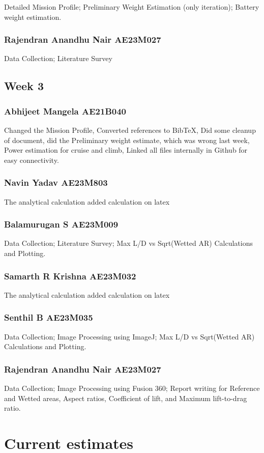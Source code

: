 \documentclass[12 pt]{article}
\begin{document}
Detailed Mission Profile; Preliminary Weight Estimation (only iteration); Battery weight estimation.

\subsubsection{Rajendran Anandhu Nair AE23M027}

Data Collection; Literature Survey




\subsection{Week 3}


\subsubsection{Abhijeet Mangela AE21B040}
Changed the Mission Profile, Converted references to BibTeX, Did some cleanup of document, did the Preliminary weight estimate, which was wrong last week, Power estimation for cruise and climb, Linked all files internally in Github for easy connectivity.

\subsubsection{Navin Yadav AE23M803}
The analytical calculation added calculation on latex 

\subsubsection{Balamurugan S AE23M009}
Data Collection; Literature Survey; Max L/D vs Sqrt(Wetted AR) Calculations and Plotting.


\subsubsection{Samarth R Krishna AE23M032}
The analytical calculation added calculation on latex


\subsubsection{Senthil B AE23M035}
Data Collection; Image Processing using ImageJ; Max L/D vs Sqrt(Wetted AR) Calculations and Plotting.


\subsubsection{Rajendran Anandhu Nair AE23M027}
Data Collection; Image Processing using Fusion 360; Report writing for Reference and Wetted areas, Aspect ratios, Coefficient of lift, and Maximum lift-to-drag ratio. 


\section{Current estimates}
\end{document}
